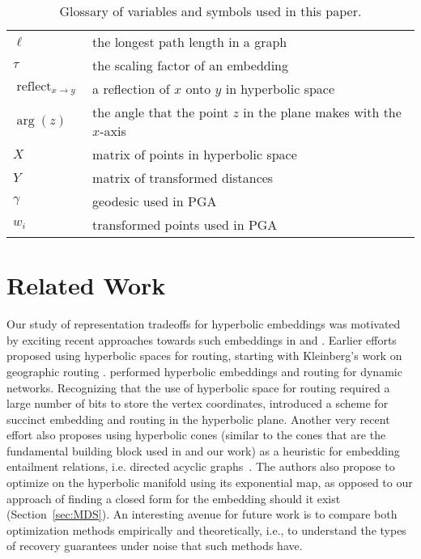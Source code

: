 \begin{table*}[h]
\begin{tabular}{l l}
$\ell$ & the longest path length in a graph \\
$\tau$ & the scaling factor of an embedding \\
$\operatorname{reflect}_{x \rightarrow y}$ & a reflection of $x$ onto $y$ in hyperbolic space \\
$\operatorname{arg}(z)$ & the angle that the point $z$ in the plane makes with the $x$-axis \\
$X$ & matrix of points in hyperbolic space \\
$Y$ & matrix of transformed distances \\
$\gamma$ & geodesic used in PGA \\
$w_i$ & transformed points used in PGA \\
\bottomrule
\end{tabular}
\caption{Glossary of variables and symbols used in this paper.}
\label{table:glossary}
\end{table*}

\section{Related Work}
\label{sec:related}
Our study of representation tradeoffs for hyperbolic embeddings was motivated by
exciting recent approaches towards such embeddings in \citet{fb} and
\citet{ucl}.
Earlier efforts proposed using hyperbolic spaces for routing, starting with Kleinberg's work on geographic routing \cite{Kleinberg}.
\citet{Crovella} performed hyperbolic embeddings and routing for dynamic networks.
Recognizing that the use of hyperbolic space for routing required a large number of bits to store the vertex coordinates, \citet{Eppstein} introduced a scheme for succinct embedding and routing in the hyperbolic plane.
Another very recent effort also proposes using hyperbolic cones (similar to the cones that are the fundamental building block used in \citet{sarkar} and our work) as a heuristic for embedding entailment relations, i.e. directed acyclic graphs~\cite{ganea}.
The authors also propose to optimize on the hyperbolic manifold using its exponential map, as opposed to our approach of finding a closed form for the embedding should it exist (Section~\ref{sec:MDS}). An interesting avenue for future work is to compare both optimization methods empirically and theoretically, i.e., to understand the types of recovery guarantees under noise that such methods have.

